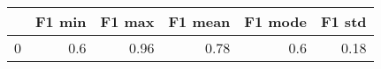 \begin{tabular}{lrrrrr}
\toprule
{} &  F1 min &  F1 max &  F1 mean &  F1 mode &  F1 std \\
\midrule
0 &     0.6 &    0.96 &     0.78 &      0.6 &    0.18 \\
\bottomrule
\end{tabular}
